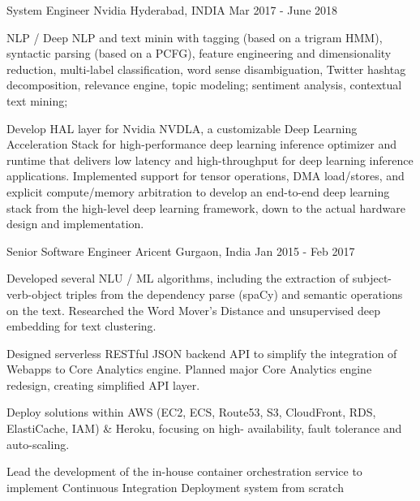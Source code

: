 
\begin{cventries}

  \cventry
    {System Engineer}
    {Nvidia}
    {Hyderabad, INDIA}
    {Mar 2017 - June 2018 }
    {
      \begin{cvitems}
        \item {NLP / Deep NLP and text minin with tagging (based on a trigram HMM), syntactic parsing (based on a PCFG), feature engineering and dimensionality reduction, multi-label classification, word sense disambiguation, Twitter hashtag decomposition, relevance engine, topic modeling; sentiment analysis, contextual text mining;}
        \item {Develop HAL layer for Nvidia NVDLA, a customizable Deep Learning Acceleration Stack for high-performance deep learning inference optimizer and runtime that delivers low latency and high-throughput for deep learning inference applications. Implemented support for tensor operations, DMA load/stores, and explicit compute/memory arbitration to develop an end-to-end deep learning stack from the high-level deep learning framework, down to the actual hardware design and implementation.}
      \end{cvitems}
    }
      
  \cventry
    {Senior Software Engineer}
    {Aricent}
    {Gurgaon, India}
    {Jan 2015 - Feb 2017}
    {
      \begin{cvitems}
	    \item {Developed several NLU / ML algorithms, including the extraction of subject-verb-object triples from the dependency parse (spaCy) and semantic operations on the text. Researched the Word Mover’s Distance and unsupervised deep embedding for text clustering. }
        \item {Designed serverless RESTful JSON backend API to simplify the integration of Webapps to Core Analytics engine. Planned major Core Analytics engine redesign, creating simplified API layer.}
        \item {Deploy solutions within AWS (EC2, ECS, Route53, S3, CloudFront, RDS, ElastiCache, IAM) \& Heroku, focusing on high- availability, fault tolerance and auto-scaling.}
        \item {Lead the development of the in-house container orchestration service to implement Continuous Integration  Deployment system from scratch}
      \end{cvitems}
    }	  
	  

\end{cventries}
